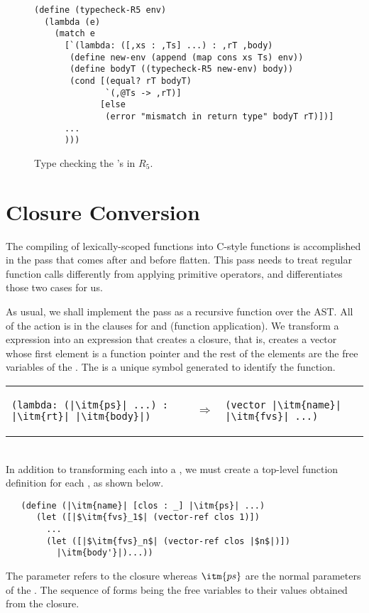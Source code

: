 \documentclass[11pt]{book}
\begin{document}
\begin{figure}[tbp]
\begin{lstlisting}
(define (typecheck-R5 env)
  (lambda (e)
    (match e
      [`(lambda: ([,xs : ,Ts] ...) : ,rT ,body)
       (define new-env (append (map cons xs Ts) env))
       (define bodyT ((typecheck-R5 new-env) body))
       (cond [(equal? rT bodyT)
              `(,@Ts -> ,rT)]
             [else
              (error "mismatch in return type" bodyT rT)])]
      ...
      )))
\end{lstlisting}
\caption{Type checking the 's in $R_5$.}
\label{fig:typecheck-R5}
\end{figure}


\section{Closure Conversion}

The compiling of lexically-scoped functions into C-style functions is
accomplished in the pass  that comes after
 and before flatten. This pass needs to treat
regular function calls differently from applying primitive operators,
and  differentiates those two cases for us.

As usual, we shall implement the pass as a recursive function over the
AST. All of the action is in the clauses for  and
 (function application). We transform a 
expression into an expression that creates a closure, that is, creates
a vector whose first element is a function pointer and the rest of the
elements are the free variables of the .  The 
is a unique symbol generated to identify the function.

\begin{tabular}{lll}
\begin{minipage}{0.4\textwidth}
\begin{lstlisting}
(lambda: (|\itm{ps}| ...) : |\itm{rt}| |\itm{body}|)
\end{lstlisting}
\end{minipage}
&
$\Rightarrow$
&
\begin{minipage}{0.4\textwidth}
\begin{lstlisting}
(vector |\itm{name}| |\itm{fvs}| ...)
\end{lstlisting}
\end{minipage}
\end{tabular}  \\
%
In addition to transforming each  into a , we
must create a top-level function definition for each , as
shown below.
\begin{lstlisting}
   (define (|\itm{name}| [clos : _] |\itm{ps}| ...)
      (let ([|$\itm{fvs}_1$| (vector-ref clos 1)])
        ...
        (let ([|$\itm{fvs}_n$| (vector-ref clos |$n$|)])
          |\itm{body'}|)...))
\end{lstlisting}
The  parameter refers to the closure whereas $\itm{ps}$ are
the normal parameters of the . The sequence of 
forms being the free variables to their values obtained from the
closure.
\end{document}
